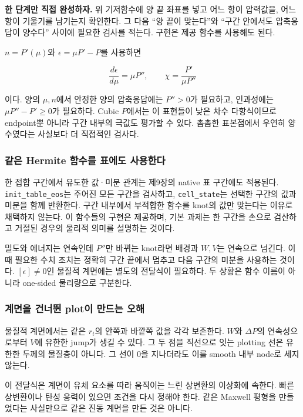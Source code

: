 \documentclass[
  10pt,
  a4paper,
]{article}
\begin{document}
\textbf{한 단계만 직접 완성하자.} 위 기저함수에 양 끝 좌표를 넣고 어느
항이 압력값을, 어느 항이 기울기를 남기는지 확인한다. 그 다음 ``양 끝이
맞는다''와 ``구간 안에서도 압축응답이 양수다'' 사이에 필요한 검사를
적는다. 구현은 제공 함수를 사용해도 된다.

\(n=P'(\mu)\)와 \(\epsilon=\mu P'-P\)를 사용하면

\[
\frac{d\epsilon}{d\mu}=\mu P'',\qquad
\chi=\frac{P'}{\mu P''}
\]

이다. 양의 \(\mu,n\)에서 안정한 양의 압축응답에는 \(P''>0\)가 필요하고,
인과성에는 \(\mu P''-P'\geq0\)가 필요하다. Cubic \(P\)에서는 이 표현들이
낮은 차수 다항식이므로 endpoint뿐 아니라 구간 내부의 극값도 평가할 수
있다. 촘촘한 표본점에서 우연히 양수였다는 사실보다 더 직접적인 검사다.

\subsubsection{같은 Hermite 함수를 표에도
사용한다}\label{uxac19uxc740-hermite-uxd568uxc218uxb97c-uxd45cuxc5d0uxb3c4-uxc0acuxc6a9uxd55cuxb2e4}

한 접합 구간에서 유도한 값·미분 관계는 제9장의 native 표 구간에도
적용된다. \texttt{init\_table\_eos}는 주어진 모든 구간을 검사하고,
\texttt{cell\_state}는 선택한 구간의 값과 미분을 함께 반환한다. 구간
내부에서 부적합한 함수를 knot의 값만 맞는다는 이유로 채택하지 않는다. 이
함수들의 구현은 제공하며, 기본 과제는 한 구간을 손으로 검산하고 거절된
경우의 물리적 의미를 설명하는 것이다.

밀도와 에너지는 연속인데 \(P''\)만 바뀌는 knot라면 배경과 \(W,V\)는
연속으로 넘긴다. 이때 필요한 수치 조치는 정확히 구간 끝에서 멈추고 다음
구간의 미분을 사용하는 것이다. \([\epsilon]\ne0\)인 물질적 계면에는
별도의 전달식이 필요하다. 두 상황은 함수 이름이 아니라 one-sided
물리량으로 구분한다.

\subsubsection{계면을 건너뛴 plot이 만드는
오해}\label{uxacc4uxba74uxc744-uxac74uxb108uxb6f4-plotuxc774-uxb9ccuxb4dcuxb294-uxc624uxd574}

물질적 계면에서는 같은 \(r_t\)의 안쪽과 바깥쪽 값을 각각 보존한다.
\(W\)와 \(\Delta P\)의 연속성으로부터 \(V\)에 유한한 jump가 생길 수
있다. 그 두 점을 직선으로 잇는 plotting 선은 유한한 두께의 물질층이
아니다. 그 선이 0을 지나더라도 이를 smooth 내부 node로 세지 않는다.

이 전달식은 계면이 유체 요소를 따라 움직이는 느린 상변환의 이상화에
속한다. 빠른 상변환이나 탄성 응력이 있으면 조건을 다시 정해야 한다. 같은
Maxwell 평형을 만들었다는 사실만으로 같은 진동 계면을 만든 것은 아니다.
\end{document}
